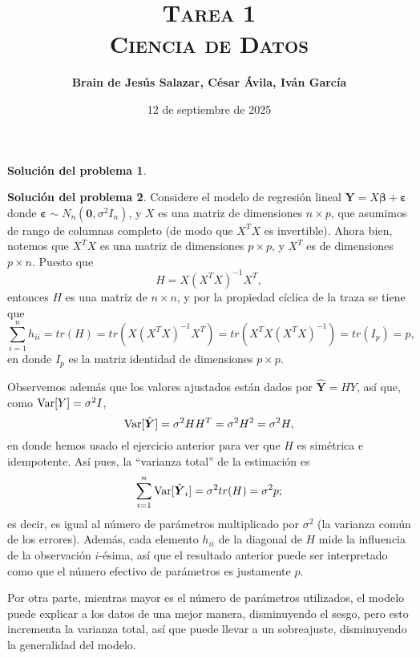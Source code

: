 \documentclass[twoside,12pt]{article}
\title{\textsc{Tarea 1\\ {\Large Ciencia de Datos}}}
\author{\large{\textbf{Brain de Jesús Salazar, César Ávila, Iván García}}}
\date{12 de septiembre de 2025}
\theoremstyle{definition}
\newtheorem{soln}{Solución del problema}
\newcommand{\variance}{\mathrm{\normalfont Var}}
\begin{document}
\maketitle


\begin{soln}
\end{soln}


\newpage
\begin{soln}
Considere el modelo de regresión lineal $\boldsymbol{Y}=X\boldsymbol{\beta} + \boldsymbol{\varepsilon}$ donde $\boldsymbol{\varepsilon}\sim N_n(\boldsymbol{0},\sigma^2 I_n)$, y $X$ es una matriz de dimensiones $n\times p$, que asumimos de rango de columnas completo (de modo que $X^T X$ es invertible). Ahora bien, notemos que $X^T X$ es una matriz de dimensiones $p\times p$, y $X^T$ es de dimensiones $p\times n$. Puesto que 
\[
H=X{(X^T X)}^{-1}X^T,
\]
entonces $H$ es una matriz de $n\times n$, y por la propiedad cíclica de la traza se tiene que
\[
\sum_{i=1}^{n} h_{ii} = tr(H) = tr\left(X{(X^T X)}^{-1}X^T\right) = tr\left(X^T X {(X^T X)}^{-1}\right) = tr(I_p)=p,
\]
en donde $I_p$ es la matriz identidad de dimensiones $p\times p$.

Observemos además que los valores ajustados están dados por $\hat{\boldsymbol{Y}}=HY$, así que, como $\variance[Y]=\sigma^2 I$,
\[
\variance[\hat{\boldsymbol{Y}}] = \sigma^2 H H^T = \sigma^2 H^2 = \sigma^2 H,
\]
en donde hemos usado el ejercicio anterior para ver que $H$ es simétrica e idempotente. Así pues, la ``varianza total'' de la estimación es
\[
\sum_{i=1}^{n} \variance[\hat{\boldsymbol{Y}}_i] = \sigma^2 tr(H) = \sigma^2 p;
\]
es decir, es igual al número de parámetros multiplicado por $\sigma^2$ (la varianza común de los errores). Además, cada elemento $h_{ii}$ de la diagonal de $H$ mide la influencia de la observación $i$-ésima, así que el resultado anterior puede ser interpretado como que el número efectivo de parámetros es justamente $p$.

Por otra parte, mientras mayor es el número de parámetros utilizados, el modelo puede explicar a los datos de una mejor manera, disminuyendo el sesgo, pero esto incrementa la varianza total, así que puede llevar a un sobreajuste, disminuyendo la generalidad del modelo.
\end{soln}
\end{document}
